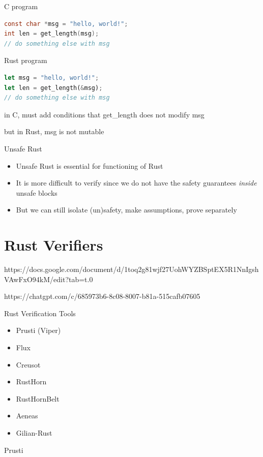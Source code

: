 \documentclass{beamer}
\begin{document}
\begin{frame}[fragile]
\begin{block}{C program}
\begin{lstlisting}[language=C]
const char *msg = "hello, world!"; 
int len = get_length(msg);
// do something else with msg
\end{lstlisting}
\end{block}

\begin{block}{Rust program}
\begin{lstlisting}[language=rust]
let msg = "hello, world!"; 
let len = get_length(&msg);  
// do something else with msg
\end{lstlisting}
\end{block}


in C, must add conditions that get\_length does not modify 
msg

but in Rust, msg is not mutable
\end{frame}

\begin{frame}{Unsafe Rust} 
\begin{itemize}
\item 
Unsafe Rust is essential for functioning of Rust 
\item 
It is more difficult to verify since we do not have the safety guarantees \emph{inside} unsafe blocks
\item 
But we can still isolate (un)safety, make assumptions, prove separately
\end{itemize} 
\end{frame} 

\section{Rust Verifiers}

https://docs.google.com/document/d/1toq2g81wjf27UohWYZBSptEX5R1NnIgshVAwFxO94kM/edit?tab=t.0

https://chatgpt.com/c/685973b6-8c08-8007-b81a-515cafb07605

\begin{frame}{Rust Verification Tools}
\begin{itemize} 
\item Prusti (Viper)
\item Flux
\item Creusot
\item RustHorn
\item RustHornBelt
\item Aeneas
\item Gilian-Rust
\end{itemize} 
\end{frame}

\begin{frame}{Prusti} 

\end{frame}
\end{document}

